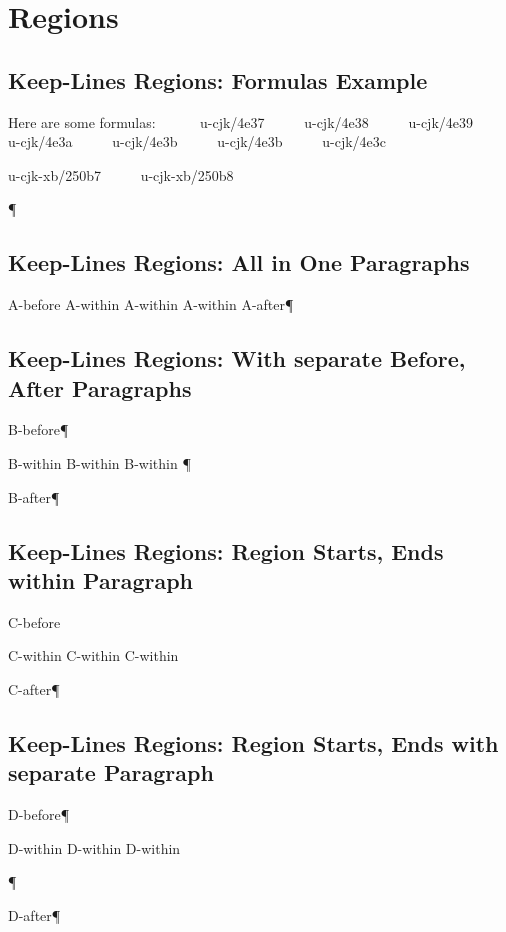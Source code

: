 

\chapter{Regions
}

\section{Keep-Lines Regions: Formulas Example
}
Here are some formulas:
\begingroup{}     
{\mktsFontfileSourcecodeproregular{}u-cjk/4e37}     
{\mktsFontfileSourcecodeproregular{}u-cjk/4e38}     
{\mktsFontfileSourcecodeproregular{}u-cjk/4e39}     
{\mktsFontfileSourcecodeproregular{}u-cjk/4e3a}     
{\mktsFontfileSourcecodeproregular{}u-cjk/4e3b}     
{\mktsFontfileSourcecodeproregular{}u-cjk/4e3b}     
{\mktsFontfileSourcecodeproregular{}u-cjk/4e3c}     

{\mktsFontfileSourcecodeproregular{}u-cjk-xb/250b7}     
{\mktsFontfileSourcecodeproregular{}u-cjk-xb/250b8}     

\endgroup{}¶\par

\section{Keep-Lines Regions: All in One Paragraphs
}
A-before
\begingroup\obeyalllines{}A-within
A-within
A-within
\endgroup{}A-after¶\par

\section{Keep-Lines Regions: With separate Before, After Paragraphs
}
B-before¶\par
\begingroup\obeyalllines{}B-within
B-within
B-within
\endgroup{}¶\par
B-after¶\par

\section{Keep-Lines Regions: Region Starts, Ends within Paragraph
}
C-before
\begingroup\obeyalllines{}

C-within
C-within
C-within

\endgroup{}C-after¶\par

\section{Keep-Lines Regions: Region Starts, Ends with separate Paragraph
}
D-before¶\par
\begingroup\obeyalllines{}

D-within
D-within
D-within

\endgroup{}¶\par
D-after¶\par

